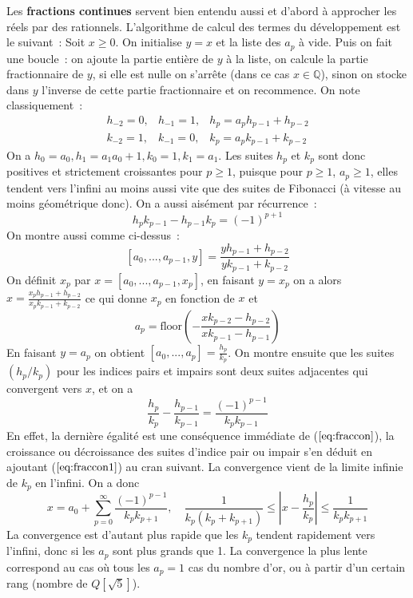 \documentclass[a4paper,11pt]{article}
\begin{document}
\begin{giacjshere}
Les {\bf fractions continues} 
 servent bien entendu aussi et d'abord \`a approcher les
r\'eels par des rationnels.
L'algorithme de calcul des termes du d\'eveloppement est le suivant~:
Soit $x\geq0$. On initialise $y=x$ et la liste des $a_p$ \`a vide. 
Puis on fait une boucle~: on ajoute la partie enti\`ere de $y$ \`a la
liste, on calcule la partie fractionnaire de $y$, si elle est nulle on
s'arr\^ete (dans ce cas $x\in \mathbb{Q}$),
sinon on stocke dans $y$ l'inverse de cette partie fractionnaire et on recommence.
On note classiquement~:
\begin{eqnarray} h_{-2}=0, & h_{-1}=1, & h_p=a_p h_{p-1}+h_{p-2}\\
k_{-2}=1, & k_{-1}=0, & k_p=a_p k_{p-1}+k_{p-2}
\end{eqnarray}
On a $h_0=a_0, h_1=a_1 a_0+1, k_0=1, k_1=a_1$.
Les suites $h_p$ et $k_p$ sont donc positives et strictement croissantes pour $p
\geq 1$, puisque pour $p \geq 1$, $a_p\geq 1$, elles tendent vers
l'infini au moins aussi vite que des suites de Fibonacci (\`a vitesse
au moins g\'eom\'etrique donc).
On a aussi ais\'ement par r\'ecurrence~:
\begin{equation} \label{eq:fraccon}
 h_p k_{p-1} - h_{p-1}k_p=(-1)^{p+1}
\end{equation}
On montre aussi comme ci-dessus~:
$$ [a_0,...,a_{p-1},y]=\frac{yh_{p-1}+h_{p-2}}{yk_{p-1}+k_{p-2}}$$
On d\'efinit $x_p$ par $x=[a_0,...,a_{p-1},x_p]$, en faisant $y=x_p$
on a alors $x=\frac{x_ph_{p-1}+h_{p-2}}{x_p k_{p-1}+k_{p-2}}$ ce qui
donne $x_p$ en fonction de $x$ et
$$ a_p=\mbox{floor}\left( - \frac{xk_{p-2}-h_{p-2}}{xk_{p-1}-h_{p-1}} \right)$$
En faisant $y=a_p$ on obtient $[a_0,...,a_p]=\frac{h_p}{k_p}$.
On montre ensuite que les suites $(h_p/k_p)$ pour les indices pairs et impairs sont deux
suites adjacentes qui convergent vers $x$, et on a
\begin{equation} \label{eq:fraccon1}
\frac{h_p}{k_p} - \frac{h_{p-1}}{k_{p-1}} = \frac{(-1)^{p-1}}{k_p
  k_{p-1}}
\end{equation}
En effet, la derni\`ere \'egalit\'e est une cons\'equence imm\'ediate
de (\(\ref{eq:fraccon}\)), la croissance ou d\'ecroissance des suites
d'indice pair ou impair s'en d\'eduit en ajoutant (\(\ref{eq:fraccon1}\)) au cran
suivant. La convergence vient de la
limite infinie de $k_p$ en l'infini.
On a donc
$$ x=a_0+\sum_{p=0}^\infty \frac{(-1)^{p-1}}{k_p k_{p+1}}, 
\quad \frac{1}{k_p(k_p+k_{p+1})} \leq |x-\frac{h_p}{k_p}| \leq \frac{1}{k_p
  k_{p+1}}$$
La convergence est d'autant plus rapide que les $k_p$ tendent
rapidement vers l'infini, donc si les $a_p$ sont plus grands que 1.
La convergence la plus lente correspond au cas o\`u tous les $a_p=1$
cas du nombre d'or, ou \`a partir d'un certain rang (nombre de $Q[\sqrt{5}]$).


\end{giacjshere}
\end{document}
